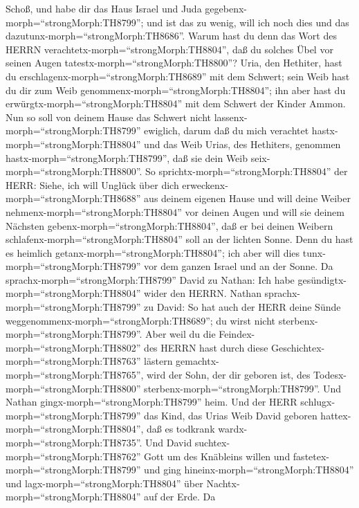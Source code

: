 Schoß, und habe dir das Haus Israel und Juda
gegebenx-morph=``strongMorph:TH8799''; und ist das zu wenig, will ich
noch dies und das dazutunx-morph=``strongMorph:TH8686''. 
Warum hast du denn das Wort des HERRN
verachtetx-morph=``strongMorph:TH8804'', daß du solches Übel vor seinen
Augen tatestx-morph=``strongMorph:TH8800''? Uria, den Hethiter, hast du
erschlagenx-morph=``strongMorph:TH8689'' mit dem Schwert; sein Weib hast
du dir zum Weib genommenx-morph=``strongMorph:TH8804''; ihn aber hast du
erwürgtx-morph=``strongMorph:TH8804'' mit dem Schwert der Kinder Ammon.
 Nun so soll von deinem Hause das Schwert nicht
lassenx-morph=``strongMorph:TH8799'' ewiglich, darum daß du mich
verachtet hastx-morph=``strongMorph:TH8804'' und das Weib Urias, des
Hethiters, genommen hastx-morph=``strongMorph:TH8799'', daß sie dein
Weib seix-morph=``strongMorph:TH8800''.  So
sprichtx-morph=``strongMorph:TH8804'' der HERR: Siehe, ich will Unglück
über dich erweckenx-morph=``strongMorph:TH8688'' aus deinem eigenen
Hause und will deine Weiber nehmenx-morph=``strongMorph:TH8804'' vor
deinen Augen und will sie deinem Nächsten
gebenx-morph=``strongMorph:TH8804'', daß er bei deinen Weibern
schlafenx-morph=``strongMorph:TH8804'' soll an der lichten Sonne.
 Denn du hast es heimlich
getanx-morph=``strongMorph:TH8804''; ich aber will dies
tunx-morph=``strongMorph:TH8799'' vor dem ganzen Israel und an der
Sonne.  Da sprachx-morph=``strongMorph:TH8799'' David zu
Nathan: Ich habe gesündigtx-morph=``strongMorph:TH8804'' wider den
HERRN. Nathan sprachx-morph=``strongMorph:TH8799'' zu David: So hat auch
der HERR deine Sünde weggenommenx-morph=``strongMorph:TH8689''; du wirst
nicht sterbenx-morph=``strongMorph:TH8799''.  Aber weil du
die Feindex-morph=``strongMorph:TH8802'' des HERRN hast durch diese
Geschichtex-morph=``strongMorph:TH8763'' lästern
gemachtx-morph=``strongMorph:TH8765'', wird der Sohn, der dir geboren
ist, des Todesx-morph=``strongMorph:TH8800''
sterbenx-morph=``strongMorph:TH8799''.  Und Nathan
gingx-morph=``strongMorph:TH8799'' heim. Und der HERR
schlugx-morph=``strongMorph:TH8799'' das Kind, das Urias Weib David
geboren hattex-morph=``strongMorph:TH8804'', daß es todkrank
wardx-morph=``strongMorph:TH8735''.  Und David
suchtex-morph=``strongMorph:TH8762'' Gott um des Knäbleins willen und
fastetex-morph=``strongMorph:TH8799'' und ging
hineinx-morph=``strongMorph:TH8804'' und
lagx-morph=``strongMorph:TH8804'' über
Nachtx-morph=``strongMorph:TH8804'' auf der Erde.  Da
